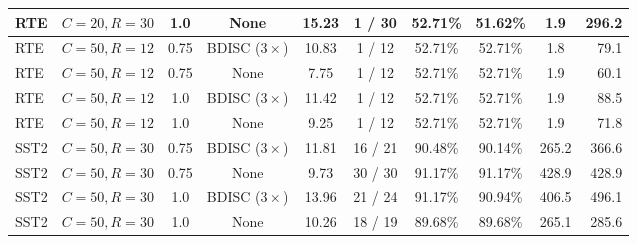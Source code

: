\documentclass[10pt,a4paper]{article}
\begin{document}
\begin{table}[H]
\begin{tabular*}{\textwidth}{@{\extracolsep{\fill}}lccccccccr@{}}
RTE & $C=20, R=30$ & 1.0 & None & 15.23 & 1 / 30 & 52.71\% & 51.62\% & 1.9 & 296.2 \\
\midrule
RTE & $C=50, R=12$ & 0.75 & BDISC ($3\times$) & 10.83 & 1 / 12 & 52.71\% & 52.71\% & 1.8 & 79.1 \\
RTE & $C=50, R=12$ & 0.75 & None & 7.75 & 1 / 12 & 52.71\% & 52.71\% & 1.9 & 60.1 \\
RTE & $C=50, R=12$ & 1.0 & BDISC ($3\times$) & 11.42 & 1 / 12 & 52.71\% & 52.71\% & 1.9 & 88.5 \\
RTE & $C=50, R=12$ & 1.0 & None & 9.25 & 1 / 12 & 52.71\% & 52.71\% & 1.9 & 71.8 \\
\midrule
SST2 & $C=50, R=30$ & 0.75 & BDISC ($3\times$) & 11.81 & 16 / 21 & 90.48\% & 90.14\% & 265.2 & 366.6 \\
SST2 & $C=50, R=30$ & 0.75 & None & 9.73 & 30 / 30 & 91.17\% & 91.17\% & 428.9 & 428.9 \\
SST2 & $C=50, R=30$ & 1.0 & BDISC ($3\times$) & 13.96 & 21 / 24 & 91.17\% & 90.94\% & 406.5 & 496.1 \\
SST2 & $C=50, R=30$ & 1.0 & None & 10.26 & 18 / 19 & 89.68\% & 89.68\% & 265.1 & 285.6 \\
\bottomrule
\end{tabular*}
\end{table}
\end{document}

